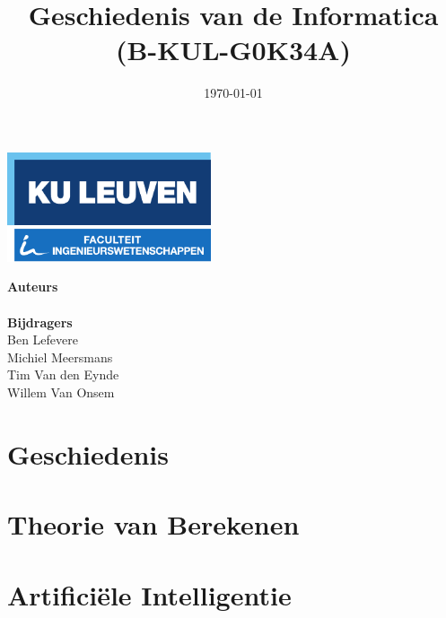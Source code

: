 \documentclass[11pt]{article}
\title{Geschiedenis van de Informatica \\ (B-KUL-G0K34A)}
\date{\today}
\author{\theauthors}
\newcommand{\thecontributors}{Ben Lefevere \\ Michiel Meersmans \\ Tim Van den Eynde \\  Willem Van Onsem }
\theoremstyle{definition}
\begin{document}

\begin{titlepage}

\thispagestyle{empty}

\begin{minipage}{\textwidth}
	\includegraphics[width=60mm]{logokuleng.pdf}
\end{minipage}

\vspace{40mm}

\begin{minipage}{\textwidth}
	\Huge
	\sffamily
	\thetitle
\end{minipage}

\vspace{50mm}

\hfill
\begin{minipage}{0.3\textwidth}
\begin{flushright}
	\Large
	\sffamily
	\textbf{Auteurs} \\
	\theauthor
	\vspace{10mm} \\
	\textbf{Bijdragers} \\
	\thecontributors
\end{flushright}
\end{minipage}
\vfill
\end{titlepage}

\newpage

\tableofcontents

\newpage

\section{Geschiedenis}



\newpage

\section{Theorie van Berekenen}

\newpage

\section{Artifici\"ele Intelligentie}

\newpage
\end{document}
